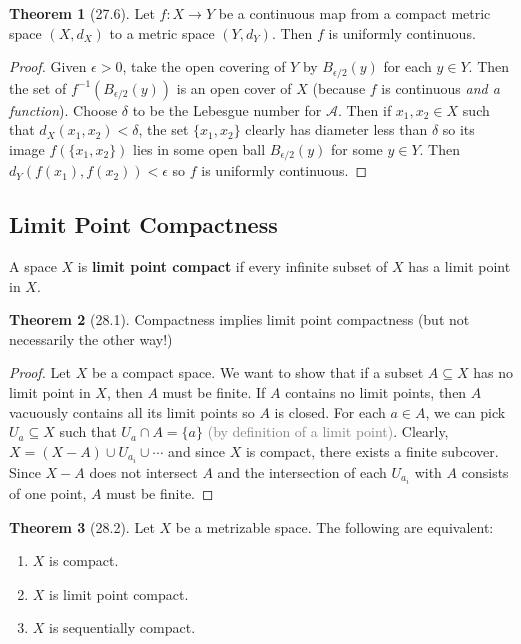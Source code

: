 \documentclass{article}
\newcommand{\com}[1]{\textcolor{grey}{#1}}
\theoremstyle{definition}
\newtheorem{theorem}{Theorem}[subsection]
\begin{document}
\begin{flushleft}
\begin{theorem}[27.6]
Let $f: X \to Y$ be a continuous map from a compact metric space $(X, d_X)$ to a metric space $(Y, d_Y)$. Then $f$ is uniformly continuous.
\end{theorem}

\begin{proof}
Given $\epsilon > 0$, take the open covering of $Y$ by $B_{\epsilon/2}(y)$ for each $y \in Y$. Then the set of $f^{-1}(B_{\epsilon/2}(y))$ is an open cover of $X$ (because $f$ is continuous \textit{and a function}). Choose $\delta$ to be the Lebesgue number for $\mathcal{A}$. Then if $x_1, x_2 \in X$ such that $d_X(x_1,x_2) < \delta$, the set $\{x_1,x_2\}$ clearly has diameter less than $\delta$ so its image $f(\{x_1,x_2\})$ lies in some open ball $B_{\epsilon/2}(y)$ for some $y \in Y$. Then $d_Y(f(x_1),f(x_2)) < \epsilon$ so $f$ is uniformly continuous.
\end{proof}

\subsection{Limit Point Compactness}

A space $X$ is \textbf{limit point compact} if every infinite subset of $X$ has a limit point  in $X$.

\begin{theorem}[28.1]
Compactness implies limit point compactness (but not necessarily the other way!)
\end{theorem}

\begin{proof}
Let $X$ be a compact space. We want to show that if a subset $A \subseteq X$ has no limit point in $X$, then $A$ must be finite. If $A$ contains no limit points, then $A$ vacuously contains all its limit points so $A$ is closed. For each $a \in A$, we can pick $U_a \subseteq X$ such that $U_a \cap A = \{a\}$ \com{(by definition of a limit point)}. Clearly, $X = (X - A) \cup U_{a_i} \cup \cdots$ and since $X$ is compact, there exists a finite subcover. Since $X - A$ does not intersect $A$ and the intersection of each $U_{a_i}$ with $A$ consists of one point, $A$ must be finite.
\end{proof}

\begin{theorem}[28.2]
Let $X$ be a metrizable space. The following are equivalent:

\begin{enumerate}
    \item $X$ is compact.
    \item $X$ is limit point compact.
    \item $X$ is sequentially compact.
\end{enumerate}
\end{theorem}


\end{flushleft}
\end{document}

